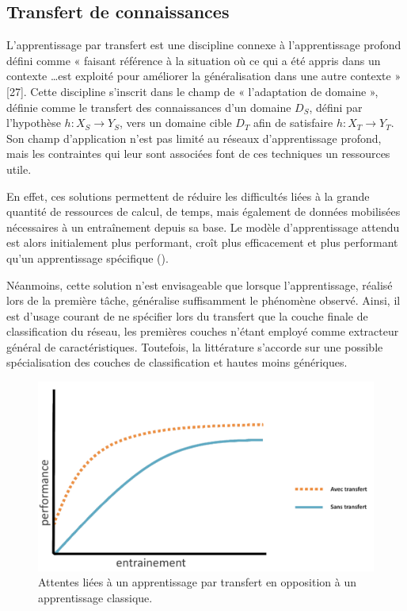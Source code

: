 \clearpage

\subsection{Transfert de connaissances}
L’apprentissage par transfert est une discipline connexe à l’apprentissage profond défini comme « faisant référence à la situation où ce qui a été appris dans un contexte \ldots est exploité pour améliorer la généralisation dans une autre contexte » [27]. Cette discipline s’inscrit dans le champ de « l’adaptation de domaine », définie comme le transfert des connaissances d’un domaine $D_S$, défini par l’hypothèse $h: X_S \rightarrow Y_S$, vers un domaine cible $D_T$ afin de satisfaire $h: X_T \rightarrow Y_T$. Son champ d'application n'est pas limité au réseaux d'apprentissage profond, mais les contraintes qui leur sont associées font de ces techniques un ressources utile.\par

En effet, ces solutions permettent de réduire les difficultés liées à la grande quantité de ressources de calcul, de temps, mais également de données mobilisées nécessaires à un entraînement depuis sa base. Le modèle d’apprentissage attendu est alors initialement plus performant, croît plus efficacement et plus performant qu’un apprentissage spécifique  ().\par

Néanmoins, cette solution n’est envisageable que lorsque l’apprentissage, réalisé lors de la première tâche, généralise suffisamment le phénomène observé. Ainsi, il est d’usage courant de ne spécifier lors du transfert que la couche finale de classification du réseau, les premières couches n’étant employé comme extracteur général de caractéristiques. Toutefois, la littérature s’accorde sur une possible spécialisation des couches de classification et hautes moins génériques.\par

\begin{figure}[H]
    \centering
    \includegraphics[width=\linewidth]{contents/chapter_3/resources/example_learning_curves.pdf}
    \caption{ Attentes liées à un apprentissage par transfert en opposition à un apprentissage classique.}
    \label{fig:learning_curves}
\end{figure}

